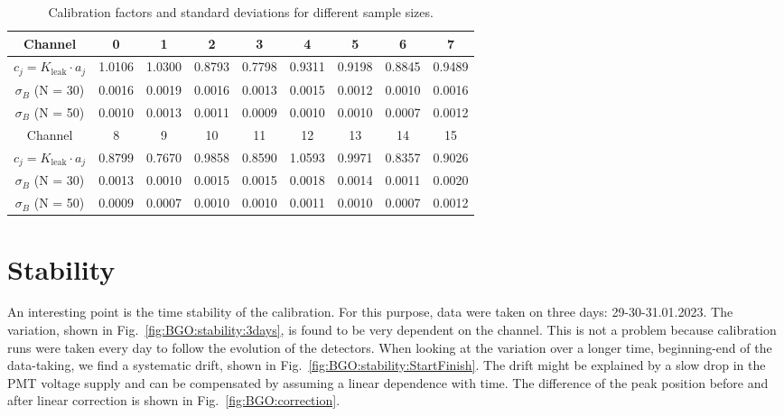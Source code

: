 \begin{refsection}
        \begin{table}[h]
        \centering
        \begin{tabular}{|c|c|c|c|c|c|c|c|c|}
        \hline
        Channel & 0 & 1 & 2 & 3 & 4 & 5 & 6 & 7 \\
        \hline
        $c_j = K_{\text{leak}} \cdot a_j$ & 1.0106 & 1.0300 & 0.8793 & 0.7798 & 0.9311 & 0.9198 & 0.8845 & 0.9489 \\
        $\sigma_B$ (N = 30) & 0.0016 & 0.0019 & 0.0016 & 0.0013 & 0.0015 & 0.0012 & 0.0010 & 0.0016 \\
        $\sigma_B$ (N = 50) & 0.0010 & 0.0013 & 0.0011 & 0.0009 & 0.0010 & 0.0010 & 0.0007 & 0.0012 \\
        \hline
        \hline
        Channel & 8 & 9 & 10 & 11 & 12 & 13 & 14 & 15 \\
        \hline
        $c_j = K_{\text{leak}} \cdot a_j$ & 0.8799 & 0.7670 & 0.9858 & 0.8590 & 1.0593 & 0.9971 & 0.8357 & 0.9026 \\
        $\sigma_B$ (N = 30) & 0.0013 & 0.0010 & 0.0015 & 0.0015 & 0.0018 & 0.0014 & 0.0011 & 0.0020 \\
        $\sigma_B$ (N = 50) & 0.0009 & 0.0007 & 0.0010 & 0.0010 & 0.0011 & 0.0010 & 0.0007 & 0.0012 \\
        \hline
        \end{tabular}
        \caption{Calibration factors and standard deviations for different sample sizes.}
        \label{tab:calibration_factors}
        \end{table}

\section{Stability}
An interesting point is the time stability of the calibration. For this purpose, data were taken on three days: 29-30-31.01.2023. 
The variation, shown in Fig.~\ref{fig:BGO:stability:3days}, is found to be very dependent on the channel. 
This is not a problem because calibration runs were taken every day to follow the evolution of the detectors.
When looking at the variation over a longer time, beginning-end of the data-taking, we find a systematic drift, shown in Fig.~\ref{fig:BGO:stability:StartFinish}.
The drift might be explained by a slow drop in the PMT voltage supply and can be compensated by assuming a linear dependence with time.
The difference of the peak position before and after linear correction is shown in Fig.~\ref{fig:BGO:correction}.


\end{refsection}
